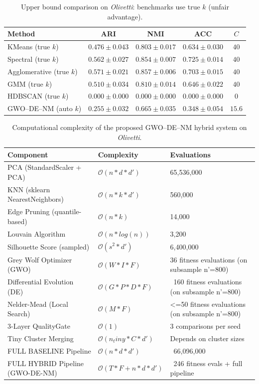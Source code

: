 \begin{table}[htbp]
\centering\small
\caption{Upper bound comparison on \textit{Olivetti}: benchmarks use true $k$ (unfair advantage).}
\label{tab:upper_olivetti}
\begin{tabular}{lcccc}
\toprule
Method & ARI & NMI & ACC & $C$ \\
\midrule
KMeans (true $k$) & $0.476 \pm 0.043$ & $0.803 \pm 0.017$ & $0.634 \pm 0.030$ & $40$ \\
Spectral (true $k$) & $0.562 \pm 0.027$ & $0.854 \pm 0.007$ & $0.725 \pm 0.014$ & $40$ \\
Agglomerative (true $k$) & $0.571 \pm 0.021$ & $0.857 \pm 0.006$ & $0.703 \pm 0.015$ & $40$ \\
GMM (true $k$) & $0.510 \pm 0.034$ & $0.810 \pm 0.014$ & $0.646 \pm 0.022$ & $40$ \\
HDBSCAN (true $k$) & $0.000 \pm 0.000$ & $0.000 \pm 0.000$ & $0.000 \pm 0.000$ & $0$ \\
\midrule
GWO--DE--NM (auto $k$) & $\mathbf{0.255 \pm 0.032}$ & $\mathbf{0.665 \pm 0.035}$ & $\mathbf{0.348 \pm 0.054}$ & $15.6$ \\
\bottomrule
\end{tabular}
\end{table}

\begin{table}[htbp]
\centering
\small
\caption{Computational complexity of the proposed GWO--DE--NM hybrid system on \textit{Olivetti}.}
\label{tab:complexity_olivetti}
\begin{tabular}{lll}
\toprule
Component & Complexity & Evaluations \\
\midrule
PCA (StandardScaler + PCA) & $\mathcal{O}(n * d * d')$ & 65,536,000 \\
KNN (sklearn NearestNeighbors) & $\mathcal{O}(n * k * d')$ & 560,000 \\
Edge Pruning (quantile-based) & $\mathcal{O}(n * k)$ & 14,000 \\
Louvain Algorithm & $\mathcal{O}(n * log(n))$ & 3,200 \\
Silhouette Score (sampled) & $\mathcal{O}(s^2 * d')$ & 6,400,000 \\
Grey Wolf Optimizer (GWO) & $\mathcal{O}(W * I * F)$ & 36 fitness evaluations (on subsample n'=800) \\
Differential Evolution (DE) & $\mathcal{O}(G * P * D * F)$ & ~160 fitness evaluations (on subsample n'=800) \\
Nelder-Mead (Local Search) & $\mathcal{O}(M * F)$ & <=50 fitness evaluations (on subsample n'=800) \\
3-Layer QualityGate & $\mathcal{O}(1)$ & 3 comparisons per seed \\
Tiny Cluster Merging & $\mathcal{O}(n_tiny * C * d')$ & Depends on cluster sizes \\
\midrule
FULL BASELINE Pipeline & $\mathcal{O}(n * d * d')$ & ~66,096,000 \\
\midrule
FULL HYBRID Pipeline (GWO-DE-NM) & $\mathcal{O}(T * F + n * d * d')$ & ~246 fitness evals + full pipeline \\
\bottomrule
\end{tabular}
\end{table}